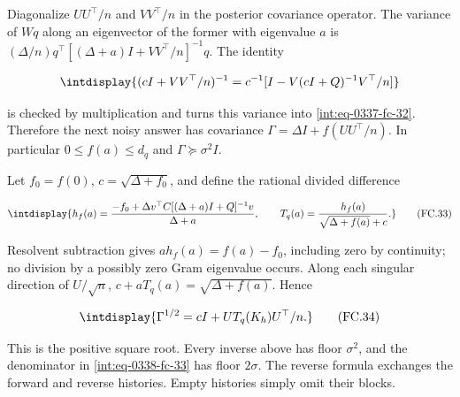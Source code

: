 Diagonalize \(UU^\top/n\) and \(VV^\top/n\) in the posterior covariance operator. The variance of \(Wq\) along an eigenvector of the former with eigenvalue \(a\) is \((\Delta/n)q^\top[(\Delta+a)I+VV^\top/n]^{-1}q\). The identity


\begingroup\renewcommand{\theHequation}{intdisplay.734}
\begin{equation*}
\intdisplay{
(cI+VV^\top/n)^{-1}
=c^{-1}[I-V(cI+Q)^{-1}V^\top/n]
}
\end{equation*}
\endgroup


is checked by multiplication and turns this variance into \eqref{int:eq-0337-fc-32}. Therefore the next noisy answer has covariance \(\Gamma=\Delta I+f(UU^\top/n)\). In particular \(0\le f(a)\le d_q\) and \(\Gamma\succeq\sigma^2I\).



Let \(f_0=f(0)\), \(c=\sqrt{\Delta+f_0}\), and define the rational divided difference


\begingroup\renewcommand{\theHequation}{intdisplay.735}
\begin{equation}
\intdisplay{
h_f(a)=\frac{-f_0+\Delta v^\top C[(\Delta+a)I+Q]^{-1}v}{\Delta+a},
\qquad
T_q(a)=\frac{h_f(a)}{\sqrt{\Delta+f(a)}+c}.
}
\tag{FC.33}
\label{int:eq-0338-fc-33}
\end{equation}
\endgroup


Resolvent subtraction gives \(a h_f(a)=f(a)-f_0\), including zero by continuity; no division by a possibly zero Gram eigenvalue occurs. Along each singular direction of \(U/\sqrt n\), \(c+aT_q(a)=\sqrt{\Delta+f(a)}\). Hence


\begingroup\renewcommand{\theHequation}{intdisplay.736}
\begin{equation}
\intdisplay{
\Gamma^{1/2}=cI+UT_q(K_h)U^\top/n.
}
\tag{FC.34}
\label{int:eq-0339-fc-34}
\end{equation}
\endgroup


This is the positive square root. Every inverse above has floor \(\sigma^2\), and the denominator in \eqref{int:eq-0338-fc-33} has floor \(2\sigma\). The reverse formula exchanges the forward and reverse histories. Empty histories simply omit their blocks.


